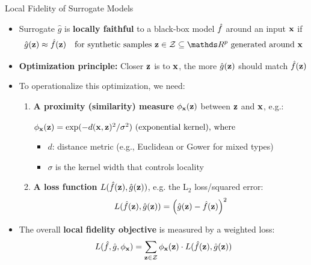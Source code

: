 \documentclass[10pt,compress,t,notes=noshow, xcolor=table]{beamer}
\newcommand{\gh}{\hat{g}}
\begin{document}
\begin{frame}{Local Fidelity of Surrogate Models}

  \begin{itemize}
    \item Surrogate \( \gh \) is \textbf{locally faithful} to a black-box model \( \hat{f} \) around an input \( \mathbf{x} \) if
    \[
    \gh(\zv) \approx \fh(\zv) \quad \text{for synthetic samples } \zv \in \Zspace \subseteq \R^p \text{ generated around } \xv
    \]

    \pause

    \item \textbf{Optimization principle:} Closer \( \mathbf{z} \) is to \( \mathbf{x} \), the more \( \gh(\zv) \) should match \( \hat{f}(\mathbf{z}) \)

    \pause

    \item To operationalize this optimization, we need:
    \begin{enumerate}
      \item \textbf{A proximity (similarity) measure} $\phi_{\mathbf{x}}(\mathbf{z})$ between $\mathbf{z}$ and $\mathbf{x}$, e.g.:
      
        \medskip
        \centerline{$
        \phi_{\mathbf{x}}(\mathbf{z}) = \exp(-d(\mathbf{x}, \mathbf{z})^2 / \sigma^2)  \text{ (exponential kernel), where}
        $}
        \medskip
        
        \begin{itemize}
            \item \( d \): distance metric (e.g., Euclidean or Gower for mixed types)
            \item \( \sigma \) is the kernel width that controls locality
        \end{itemize}
        
        

      \pause
      \item \textbf{A loss function} \( L(\fh(\zv), \gh(\zv)) \), e.g. the L$_2$ loss/squared error:
        \[
        L(\fh(\zv), \gh(\zv)) = \left( \gh(\zv) - \fh(\zv) \right)^2
        \]
    \end{enumerate}

    \pause

    \item The overall \textbf{local fidelity objective} is measured by a weighted loss:
    \[
    L(\fh, \gh, \neigh) = \sum_{\zv \in \Zspace} \neigh(\zv) \cdot L(\fh(\zv), \gh(\zv))
    \]
  \end{itemize}
\end{frame}
\end{document}
